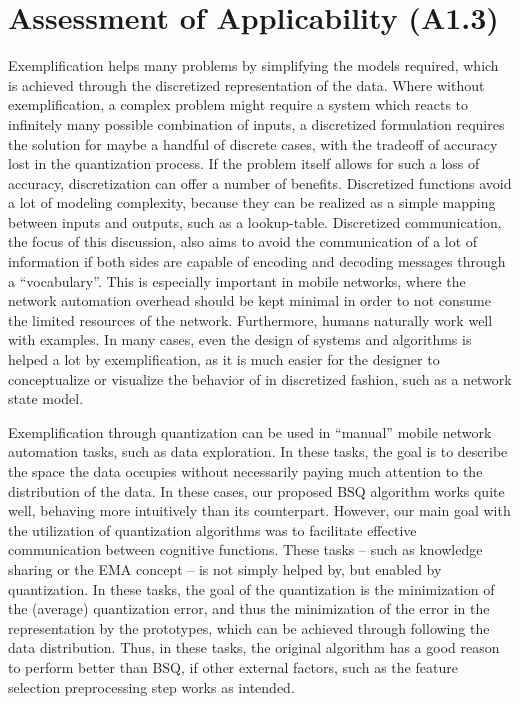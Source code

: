 	\section{Assessment of Applicability (A1.3)}
	
		Exemplification helps many problems by simplifying the models required, which is achieved through the discretized representation of the data.
		Where without exemplification, a complex problem might require a system which reacts to infinitely many possible combination of inputs, a discretized formulation requires the solution for maybe a handful of discrete cases, with the tradeoff of accuracy lost in the quantization process.
		If the problem itself allows for such a loss of accuracy, discretization can offer a number of benefits.
		Discretized functions avoid a lot of modeling complexity, because they can be realized as a simple mapping between inputs and outputs, such as a lookup-table.
		Discretized communication, the focus of this discussion, also aims to avoid the communication of a lot of information if both sides are capable of encoding and decoding messages through a ``vocabulary''.
		This is especially important in mobile networks, where the network automation overhead should be kept minimal in order to not consume the limited resources of the network. 
		Furthermore, humans naturally work well with examples.
		In many cases, even the design of systems and algorithms is helped a lot by exemplification, as it is much easier for the designer to conceptualize or visualize the behavior of in discretized fashion, such as a network state model.
				
		Exemplification through quantization can be used in ``manual'' mobile network automation tasks, such as data exploration.
		In these tasks, the goal is to describe the space the data occupies without necessarily paying much attention to the distribution of the data.
		In these cases, our proposed \ac{BSQ} algorithm works quite well, behaving more intuitively than its \kmeans{} counterpart.
		However, our main goal with the utilization of quantization algorithms was to facilitate effective communication between cognitive functions.
		These tasks -- such as knowledge sharing or the \ac{EMA} concept -- is not simply helped by, but enabled by quantization.
		In these tasks, the goal of the quantization is the minimization of the (average) quantization error, and thus the minimization of the error in the representation by the prototypes, which can be achieved through following the data distribution.
		Thus, in these tasks, the original \kmeans{} algorithm has a good reason to perform better than \ac{BSQ}, if other external factors, such as the feature selection preprocessing step works as intended.	
	

		

			

		